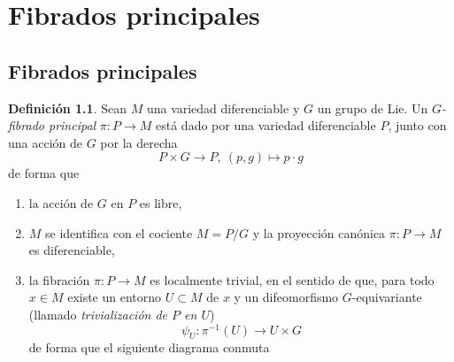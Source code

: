 \documentclass[11pt,a4paper]{amsbook}
\theoremstyle{remark} \newtheorem{rmk}[subsection]{Observación}
\theoremstyle{definition} \newtheorem{defn}[subsection]{Definición}
\theoremstyle{definition} \newtheorem{ex}[subsection]{Ejemplo}
\theoremstyle{definition} \newtheorem{ej}[subsection]{Ejercicio}
\begin{document}
\chapter{Fibrados principales}

\section{Fibrados principales}
\begin{defn}
Sean $M$ una variedad diferenciable y $G$ un grupo de Lie. Un \emph{$G$-fibrado principal} $\pi:P\rightarrow M$ está dado por una variedad diferenciable $P$, junto con una acción de $G$ por la derecha
\begin{equation*}
P \times G \rightarrow P,\ (p,g) \mapsto p\cdot g
\end{equation*}
de forma que
\begin{enumerate}
  \item la acción de $G$ en $P$ es libre,
  \item $M$ se identifica con el cociente $M=P/G$ y la proyección canónica $\pi:P\rightarrow M$ es diferenciable,
  \item la fibración $\pi:P\rightarrow M$ es localmente trivial, en el sentido de que, para todo $x\in M$ existe un entorno $U\subset M$ de $x$ y un difeomorfismo $G$-equivariante (llamado \emph{trivialización de $P$ en $U$})
        \begin{equation*}
\psi_U: \pi^{-1}(U) \rightarrow U \times G
        \end{equation*}
        de forma que el siguiente diagrama conmuta
        \begin{center}
        \end{center}
\end{enumerate}
\end{defn}
\end{document}
